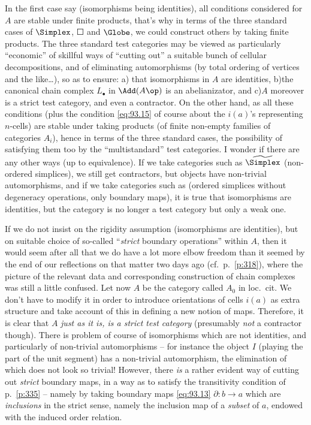 In the first case say (isomorphisms being identities), all conditions
considered for $A$ are stable under finite products, that's why in
terms of the three standard cases of $\Simplex$, $\Square$ and
$\Globe$, we could construct others by taking finite products. The
three standard test categories may be viewed as particularly
``economic'' of skillful ways of ``cutting out'' a suitable bunch of
cellular decompositions, and of eliminating automorphisms (by total
ordering of vertices and the like\ldots), so as to ensure: a)\enspace
that isomorphisms in $A$ are identities, b)\enspace the canonical
chain complex $L_\bullet$ in $\Add(A\op)$ is an abelianizator, and
c)\enspace $A$ moreover is a strict test category, and even a
contractor. On the other hand, as all these conditions (plus the
condition \eqref{eq:93.15} of course about the $i(a)$'s representing
$n$-cells) are stable under taking products (of finite
non-empty families of categories $A_i$), hence in terms of the three
standard cases, the possibility of satisfying them too by the
``multistandard'' test categories. I wonder if there are any other
ways (up to equivalence). If we take categories such as
$\widetilde\Simplex$ (non-ordered simplices), we still get
contractors, but objects have non-trivial automorphisms, and if we
take categories such as \Simplexf{} (ordered simplices without
degeneracy operations, only boundary maps), it is true that
isomorphisms are identities, but the category is no longer a test
category but only a weak one.

If we do not insist on the rigidity assumption (isomorphisms are
identities), but on suitable choice of so-called ``\emph{strict}
boundary operations'' within $A$, then it would seem after all that we
do have a lot more elbow freedom than it seemed by the end of our
reflections on that matter two days ago (cf.\ p.\ \ref{p:318}), where
the picture of the relevant data and corresponding construction of
chain complexes was still a little confused. Let now $A$ be the
category called $A_0$ in loc.\ cit.  We don't have to modify it in
order to introduce orientations of cells $i(a)$ as extra structure and
take account of this in defining a new notion of maps. Therefore, it
is clear that $A$ \emph{just as it is, is a strict test category}
(presumably \emph{not} a contractor though). There is problem of
course of isomorphisms which are not identities, and particularly of
non-trivial automorphisms -- for instance the object $I$ (playing the
part of the unit segment) has a non-trivial automorphism, the
elimination of which does not look so trivial! However, there
\emph{is} a rather evident way of cutting out \emph{strict} boundary
maps, in a way as to satisfy the transitivity condition of p.\
\ref{p:335} -- namely by taking boundary maps \eqref{eq:93.13}
$\partial:b\to a$ which are \emph{inclusions} in the strict sense,
namely the inclusion map of a \emph{subset} of $a$, endowed with the
induced order relation.

